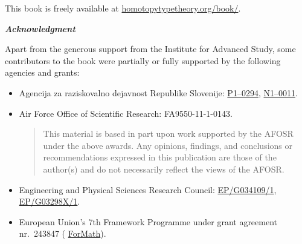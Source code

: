 {\bigskip

\noindent
This book is freely available at \href{http://homotopytypetheory.org/book/}{homotopytypetheory.org/book/}.

\bigskip

\noindent
\emph{\textbf{\small Acknowledgment}}

\medskip

\noindent
Apart from the generous support from the Institute for Advanced Study, some contributors
to the book were partially or fully supported by the following agencies and grants:
%
\begin{itemize}
\item Agencija za raziskovalno dejavnost Republike Slovenije:  %
\href{http://www.sicris.si/search/prg.aspx?id=6120}{P1--0294},
\href{http://www.sicris.si/search/prj.aspx?id=7109}{N1--0011}.

\item Air Force Office of Scientific Research:
  FA9550-11-1-0143. %
  {
    \setlength{\parskip}{0pt}
    \begin{quote}
      \noindent\scriptsize
      This material is based in part upon work supported by the AFOSR under the above awards.
      Any opinions, findings, and conclusions or recommendations expressed in this publication are those of the author(s) and do not necessarily reflect the views of the AFOSR.
    \end{quote}
  }

\item Engineering and Physical Sciences Research Council: %
   \href{http://gow.epsrc.ac.uk/NGBOViewGrant.aspx?GrantRef=EP/G034109/1}{EP/G034109/1}, %
   \href{http://gow.epsrc.ac.uk/NGBOViewGrant.aspx?GrantRef=EP/G03298X/1}{EP/G03298X/1}. %

\item European Union's 7th Framework Programme under grant agreement nr.\ 243847 (%
\href{http://wiki.portal.chalmers.se/cse/pmwiki.php/ForMath/ForMath/}{ForMath}). %


\end{itemize}}
